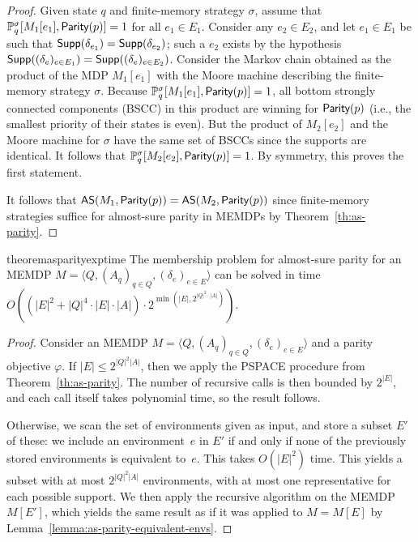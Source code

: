 \documentclass[a4paper,USenglish,cleveref, autoref, thm-restate]{lipics-v2021}
\def\abs#1{\ensuremath{\lvert #1 \rvert}}
\newcommand{\tuple}[1]{\langle #1 \rangle}
\newcommand*{\pr}{\mathbb{P}}
\newcommand\Supp{\textrm{\sf Supp}}
\newcommand\almostsure{\textrm{\sf AS}}
\newcommand\Parity{\textrm{\sf Parity}}
\newcommand\straa{\sigma}
\begin{document}
\begin{proof}
	Given state $q$ and finite-memory strategy $\straa$, assume that $\pr_{q}^{\straa}[M_1[e_1], \Parity(p)] = 1$ for all $e_1\in E_1$.
	Consider any $e_2 \in E_2$, and let $e_1\in E_1$ be such that $\Supp(\delta_{e_1}) = \Supp(\delta_{e_2})$; 
	such a $e_2$ exists by the hypothesis $\Supp((\delta_e)_{e \in E_1}) = \Supp((\delta_e)_{e \in E_2})$.
	Consider the Markov chain obtained as the product of the MDP $M_1[e_1]$ with the Moore machine describing the finite-memory strategy $\straa$.
	Because $\pr_{q}^{\straa}[M_1[e_1], \Parity(p)] = 1$, all bottom strongly connected components (BSCC) 
	in this product are winning for $\Parity(p)$ (i.e., the smallest priority of their states is even).
	But the product of $M_2[e_2]$ and the Moore machine for $\straa$ have the same set of BSCCs since the supports are identical.
	It follows that $\pr_{q}^{\straa}[M_2[e_2], \Parity(p)]=1$. By symmetry, this proves the first statement.

	It follows that $\almostsure(M_1, \Parity(p)) = \almostsure(M_2, \Parity(p))$ since
	finite-memory strategies suffice for almost-sure parity in MEMDPs by Theorem~\ref{th:as-parity}.
	
\end{proof}

\begin{restatable}{theorem}{asparityexptime}
	\label{th:as-parity-exptime}
	The membership problem for almost-sure parity for an MEMDP
	$M = \tuple{Q, (A_q)_{q \in Q}, (\delta_e)_{e \in E}}$
	can be solved in time 
    $O((\abs{E}^2+\abs{Q}^4\cdot\abs{E}\cdot\abs{A})\cdot2^{\min(\abs{E}, 2^{\abs{Q}^2\cdot\abs{A}})})$.
\end{restatable}


\begin{proof}
	Consider an MEMDP $M = \tuple{Q, (A_q)_{q \in Q}, (\delta_e)_{e \in E}}$ and a parity objective $\varphi$. If $\abs{E} \leq 2^{\abs{Q}^2\abs{A}}$, then we apply the PSPACE procedure
	from Theorem~\ref{th:as-parity}. The number of recursive calls is then bounded by $2^{\abs{E}}$,
    and each call itself takes polynomial time, so the result follows.

	Otherwise, we scan the set of environments given as input, and store 
	a subset $E'$ of these: we include an environment~$e$ in $E'$ if and only 
	if none of the previously stored environments is equivalent to~$e$.
    This takes $O(\abs{E}^2)$ time.
	This yields a subset with at most $2^{\abs{Q}^2\abs{A}}$ environments,
	with at most one representative for each possible support. 	
	We then apply the recursive algorithm on the MEMDP $M[E']$,
	which yields the same result as if it was applied to $M=M[E]$ by Lemma~\ref{lemma:as-parity-equivalent-envs}.
\end{proof}
\end{document}

